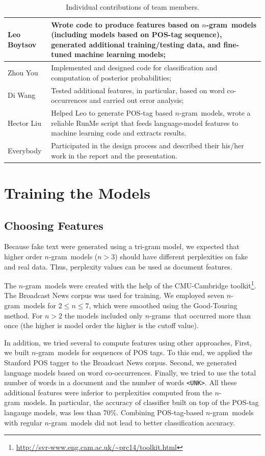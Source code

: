 \documentclass[11pt]{article}
\newcommand{\ngram}{\mbox{$n$-gram }}
\newcommand{\ngrams}{\mbox{$n$-grams }}
\newcommand{\leocomment}[1]{\todo[color=red!40,caption={Leo's comment}]{#1}}
\begin{document}
\leocomment{Please, revise.}
\begin{table}[H]
\begin{tabular}{p{1in}|p{5in}}
\hline
Leo Boytsov &  Wrote code to produce features based on \ngram models (including models based on POS-tag sequence), generated additional training/testing data, and fine-tuned machine learning models;
\\\hline
Zhou You & Implemented and designed code for classification and computation of posterior probabilities;
\\\hline
Di Wang & Tested additional features, in particular, based on word co-occurrences and
carried out error analysis;
\\\hline
Hector Liu & Helped Leo to generate POS-tag based \ngram models, wrote a 
reliable RunMe script that feeds language-model features to machine learning code
and extracts results.
\\\hline
Everybody & Participated in the design process and described their his/her work
in the report and the presentation.
\\\hline
\end{tabular}

\caption{\label{TableContrib}Individual contributions of team members.}
\end{table}

\section{Training the Models} 
\subsection{Choosing Features} Because fake text were generated using a tri-gram model, we expected that
higher order \ngram models ($n>3$) should have different perplexities on fake and real data. 
Thus, perplexity values can be used as document features. 

The \ngram models were created with the help of the CMU-Cambridge toolkit\footnote{\url{http://svr-www.eng.cam.ac.uk/~prc14/toolkit.html}}.  The Broadcast News corpus was used for training. 
We employed seven \ngram models for $2 \le n \le 7$, which were smoothed using the Good-Touring method.
For $n>2$ the models included only \ngrams that occurred more than once (the higher is model order the higher is the cutoff value).

In addition, we tried several to compute features using other approaches, 
First, we built \ngram models for sequences of POS tags. To this end, we applied the Stanford POS tagger 
to the Broadcast News corpus. Second, we generated language models based on word co-occurrences. 
\leocomment{Di, please, expand here.}
Finally, we tried to use the total number of words in a document and the number of words \texttt{<UNK>}.
All these additional features were inferior to perplexities computed from the \ngram models.
In particular, the accuracy of classifier built on top of the POS-tag langauge models,
was less than 70\%. Combining POS-tag-based \ngram models with regular \ngram models did not lead
to better classification accuracy.
\end{document}
